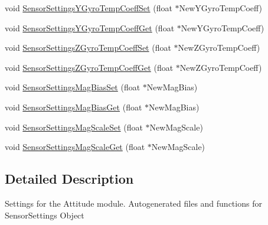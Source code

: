 \begin{DoxyCompactItemize}
void \hyperlink{group___sensor_settings_ga3d1ab1c995301e4d7e89d957d02342e6}{\-Sensor\-Settings\-Y\-Gyro\-Temp\-Coeff\-Set} (float $\ast$\-New\-Y\-Gyro\-Temp\-Coeff)
\item 
void \hyperlink{group___sensor_settings_gab2dd07c1edde42f818cd1665e6a1772f}{\-Sensor\-Settings\-Y\-Gyro\-Temp\-Coeff\-Get} (float $\ast$\-New\-Y\-Gyro\-Temp\-Coeff)
\item 
void \hyperlink{group___sensor_settings_ga3976548d8c903b7001d8dec0373401cd}{\-Sensor\-Settings\-Z\-Gyro\-Temp\-Coeff\-Set} (float $\ast$\-New\-Z\-Gyro\-Temp\-Coeff)
\item 
void \hyperlink{group___sensor_settings_ga78dddd4cc6e329c3e1a9e74ab5262930}{\-Sensor\-Settings\-Z\-Gyro\-Temp\-Coeff\-Get} (float $\ast$\-New\-Z\-Gyro\-Temp\-Coeff)
\item 
void \hyperlink{group___sensor_settings_ga3c4b30587b3fd0aeeda1dc56149cc40e}{\-Sensor\-Settings\-Mag\-Bias\-Set} (float $\ast$\-New\-Mag\-Bias)
\item 
void \hyperlink{group___sensor_settings_gaecf5bbb385036749ccae2fd27fce5bea}{\-Sensor\-Settings\-Mag\-Bias\-Get} (float $\ast$\-New\-Mag\-Bias)
\item 
void \hyperlink{group___sensor_settings_ga04cbf73d10b8201e3c8d566206629423}{\-Sensor\-Settings\-Mag\-Scale\-Set} (float $\ast$\-New\-Mag\-Scale)
\item 
void \hyperlink{group___sensor_settings_gafbe79bf9eef9c312ea58c654a885e553}{\-Sensor\-Settings\-Mag\-Scale\-Get} (float $\ast$\-New\-Mag\-Scale)
\end{DoxyCompactItemize}


\subsection{\-Detailed \-Description}
\-Settings for the \-Attitude module. \-Autogenerated files and functions for \-Sensor\-Settings \-Object 

